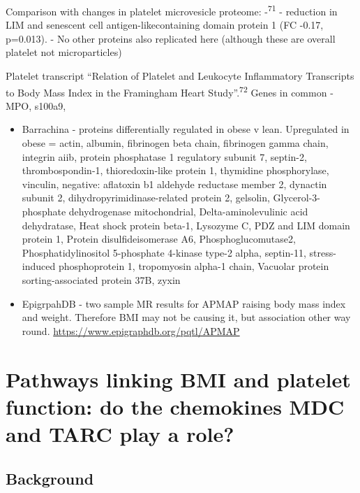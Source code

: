 \documentclass[11pt,twoside]{bristolthesis}
\begin{document}
Comparison with changes in platelet microvesicle proteome:
-\textsuperscript{71}
- reduction in LIM and senescent cell antigen-likecontaining domain protein 1
(FC -0.17, p=0.013).
- No other proteins also replicated here (although these are overall platelet not microparticles)

Platelet transcript ``Relation of Platelet and Leukocyte Inflammatory Transcripts to Body Mass Index in the Framingham Heart Study''.\textsuperscript{72} Genes in common
- MPO, s100a9,
\begin{itemize}
\item
  Barrachina - proteins differentially regulated in obese v lean. Upregulated in obese = actin, albumin, fibrinogen beta chain, fibrinogen gamma chain, integrin aiib, protein phosphatase 1 regulatory subunit 7, septin-2, thrombospondin-1, thioredoxin-like protein 1, thymidine phosphorylase, vinculin, negative: aflatoxin b1 aldehyde reductase member 2, dynactin subunit 2, dihydropyrimidinase-related protein 2, gelsolin, Glycerol-3-phosphate dehydrogenase mitochondrial, Delta-aminolevulinic acid dehydratase, Heat shock protein beta-1, Lysozyme C,
  PDZ and LIM domain protein 1, Protein disulfideisomerase A6, Phosphoglucomutase2, Phosphatidylinositol 5-phosphate 4-kinase type-2 alpha, septin-11, stress-induced phosphoprotein 1, tropomyosin alpha-1 chain, Vacuolar protein sorting-associated protein 37B, zyxin
\item
  EpigrpahDB - two sample MR results for APMAP raising body mass index and weight. Therefore BMI may not be causing it, but association other way round. \url{https://www.epigraphdb.org/pqtl/APMAP}
\end{itemize}
\hypertarget{chemokine-platelets}{%
\chapter{Pathways linking BMI and platelet function: do the chemokines MDC and TARC play a role?}\label{chemokine-platelets}}

\hypertarget{background-3}{%
\section{Background}\label{background-3}}
\end{document}
